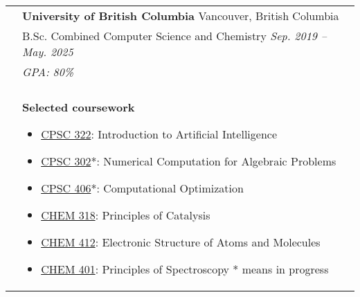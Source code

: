 \documentclass[letterpaper, 11pt]{article}
\begin{document}
\begin{longtable}{p{1.3in}p{4.8in}}
	\color{Blue}{Education}
	 & \textbf{University of British Columbia} \hfill Vancouver, British Columbia                                                                                                                                                                                                                                                                                                                \\
	 & B.Sc. Combined Computer Science and Chemistry \hfill \textit{Sep. 2019 -- May. 2025}                                                                                                                                                                                                                                                                                                      \\
	 & {\it GPA: 80\%}                                                                                                                                                                                                                                                                                                                                                                           \\
	 &                                                                                                                                                                                                                                                                                                                                                                                           \\

	 & \textbf{Selected coursework}
	\begin{itemize}[noitemsep,leftmargin=*]
		\item \underline{CPSC 322}: Introduction to Artificial Intelligence
		\item \underline{CPSC 302}*: Numerical Computation for Algebraic Problems
		\item \underline{CPSC 406}*: Computational Optimization
		\item \underline{CHEM 318}: Principles of Catalysis
		\item \underline{CHEM 412}: Electronic Structure of Atoms and Molecules
		\item \underline{CHEM 401}: Principles of Spectroscopy
* means in progress	\end{itemize}                                                                                                                                                                                                                                                                                                                       \\


\end{longtable}
\end{document}
